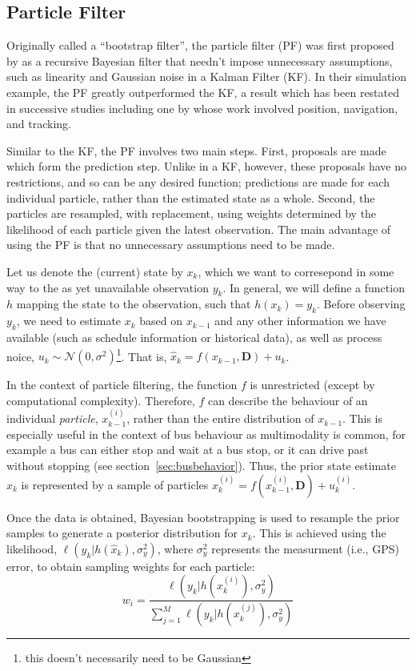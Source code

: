 \documentclass[12pt,a4paper]{article}
\begin{document}
\subsection{Particle Filter}

Originally called a ``bootstrap filter'', the particle filter (PF) was first proposed by
\cite{gordon-etal:1993} as a recursive Bayesian filter that needn't impose unnecessary assumptions,
such as linearity and Gaussian noise in a Kalman Filter (KF).
In their simulation example, the PF greatly outperformed the KF,
a result which has been restated in successive studies
including one by \cite{gustafsson-etal:2002} whose work involved position, navigation, and tracking.


Similar to the KF, the PF involves two main steps.
First, proposals are made which form the prediction step.
Unlike in a KF, however, these proposals have no restrictions, and so can be any
desired function;
predictions are made for each individual particle, rather than the estimated state as a whole.
Second, the particles are resampled, with replacement, using weights determined by the likelihood
of each particle given the latest observation.
The main advantage of using the PF is that no unnecessary assumptions need to be made. 


Let us denote the (current) state by $x_k$, which we want to corresepond in some way to the as yet
unavailable observation $y_k$.
In general, we will define a function $h$ mapping the state to the observation,
such that $h(x_k) = y_k$.
Before observing $y_k$, we need to estimate $x_k$ based on $x_{k-1}$ and any other information
we have available (such as schedule information or historical data),
as well as process noice, $u_k \sim \mathcal{N}(0,\sigma^2)$\footnote{this doesn't necessarily need to be Gaussian}.
That is, $\hat x_k = f(x_{k-1}, \mathbf{D}) + u_k$.

In the context of particle filtering, the function $f$ is unrestricted (except by computational complexity).
Therefore, $f$ can describe the behaviour of an individual \emph{particle}, $x_{k-1}^{(i)}$, 
rather than the entire distribution of $x_{k-1}$.
This is especially useful in the context of bus behaviour as multimodality is common,
for example a bus can either stop and wait at a bus stop, or it can drive past without stopping
(see section~\ref{sec:busbehavior}).
Thus, the prior state estimate $\hat x_k$ is represented 
by a sample of particles $x_k^{(i)} = f(x_{k-1}^{(i)}, \mathbf{D}) + u_k^{(i)}$.


Once the data is obtained, Bayesian bootstrapping is used to resample the prior samples to generate
a posterior distribution for $x_k$.
This is achieved using the likelihood, $\ell(y_k | h(\hat x_k), \sigma_y^2)$,
where $\sigma_y^2$ represents the measurment (i.e., GPS) error,
to obtain sampling weights for each particle:
\begin{equation}
  \label{eq:particle_weights}
  w_i = \frac{\ell(y_k | h( x_k^{(i)}), \sigma_y^2)}{\sum_{j=1}^M \ell(y_k | h( x_k^{(j)}), \sigma_y^2)}
\end{equation}
\end{document}
